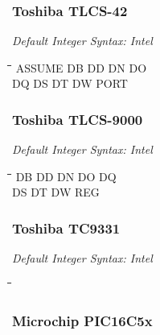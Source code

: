 \subsubsection{Toshiba TLCS-42}

{\em Default Integer Syntax: Intel}

{\tt\begin{tabbing}
\hspace{3cm}\=\hspace{3cm}\=\hspace{3cm}\=\hspace{3cm}\=\kill
ASSUME     \> DB          \> DD         \> DN          \> DO \\
DQ         \> DS          \> DT         \> DW          \> PORT \\
\end{tabbing}}

\subsubsection{Toshiba TLCS-9000}

{\em Default Integer Syntax: Intel}

{\tt\begin{tabbing}
\hspace{3cm}\=\hspace{3cm}\=\hspace{3cm}\=\hspace{3cm}\=\kill
DB         \> DD          \> DN         \> DO         \> DQ \\
DS         \> DT          \> DW         \> REG \\
\end{tabbing}}

\subsubsection{Toshiba TC9331}

{\em Default Integer Syntax: Intel}

{\tt\begin{tabbing}
\hspace{3cm}\=\hspace{3cm}\=\hspace{3cm}\=\hspace{3cm}\=\kill
\end{tabbing}}

\subsubsection{Microchip PIC16C5x}

